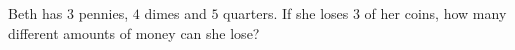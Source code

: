 Beth has $3$ pennies, $4$ dimes and $5$ quarters. If she loses $3$ of her coins, how many different amounts of money can she lose?
